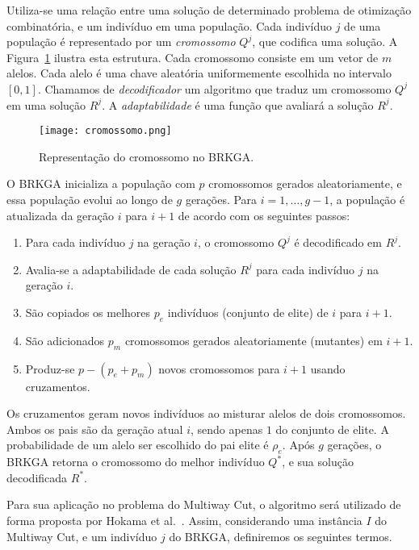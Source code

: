 \documentclass[12pt, a4paper]{article}
\begin{document}
Utiliza-se uma relação entre uma solução de determinado problema de otimização combinatória, e um indivíduo em uma população.
Cada indivíduo $j$ de uma população é representado por um \emph{cromossomo} $Q^j$, que codifica uma solução.
A Figura~\ref{fig:cromossomo} ilustra esta estrutura.
Cada cromossomo consiste em um vetor de $m$ alelos.
Cada alelo é uma chave aleatória uniformemente escolhida no intervalo $[0,1]$. Chamamos de \emph{decodificador} um algoritmo que traduz um cromossomo $Q^j$ em uma solução $R^j$. A \emph{adaptabilidade} é uma função que avaliará a solução $R^j$.

\begin{figure}[!htb]
\centering
\texttt{[image: cromossomo.png]}
\caption{Representação do cromossomo no BRKGA.}
\label{fig:cromossomo}
\end{figure}

O BRKGA inicializa a população com $p$ cromossomos gerados aleatoriamente, e essa população evolui ao longo de $g$ gerações. Para $i=1, \dots, g-1$, a população é atualizada da geração $i$ para $i+1$ de acordo com os seguintes passos:
\begin{enumerate}
  \item Para cada indivíduo $j$ na geração $i$, o cromossomo $Q^j$ é decodificado em $R^j$.
  \item Avalia-se a adaptabilidade de cada solução $R^j$ para cada indivíduo $j$ na geração $i$.
  \item São copiados os melhores $p_e$ indivíduos (conjunto de elite) de $i$ para $i+1$.
  \item São adicionados $p_m$ cromossomos gerados aleatoriamente (mutantes) em $i+1$.
  \item Produz-se $p-(p_e + p_m)$ novos cromossomos para $i+1$ usando cruzamentos.
\end{enumerate}

Os cruzamentos geram novos indivíduos ao misturar alelos de dois cromossomos. 
Ambos os pais são da geração atual $i$, sendo apenas $1$ do conjunto de elite. A probabilidade de um alelo ser escolhido do pai elite é $\rho_e$.
Após $g$ gerações, o BRKGA retorna o cromossomo do melhor indivíduo $Q^*$, e sua solução decodificada $R^*$.

Para sua aplicação no problema do Multiway Cut, o algoritmo será utilizado de forma proposta por Hokama et al.~\cite{hokama2018}. Assim, considerando uma instância $I$ do Multiway Cut, e um indivíduo $j$ do BRKGA, definiremos os seguintes termos.
\end{document}
